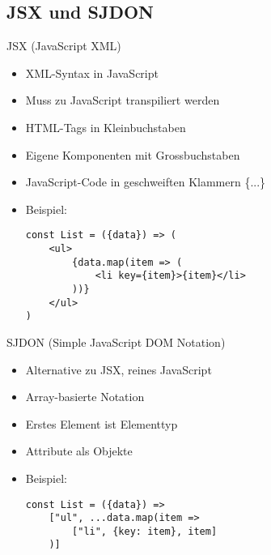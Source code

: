 \subsection{JSX und SJDON}
\begin{KR}{JSX (JavaScript XML)}
    \begin{itemize}
        \item XML-Syntax in JavaScript
        \item Muss zu JavaScript transpiliert werden
        \item HTML-Tags in Kleinbuchstaben
        \item Eigene Komponenten mit Grossbuchstaben
        \item JavaScript-Code in geschweiften Klammern \{...\}
        \item Beispiel:
            \begin{verbatim}
const List = ({data}) => (
    <ul>
        {data.map(item => (
            <li key={item}>{item}</li>
        ))}
    </ul>
)
            \end{verbatim}
    \end{itemize}
\end{KR}

\begin{KR}{SJDON (Simple JavaScript DOM Notation)}
    \begin{itemize}
        \item Alternative zu JSX, reines JavaScript
        \item Array-basierte Notation
        \item Erstes Element ist Elementtyp
        \item Attribute als Objekte
        \item Beispiel:
            \begin{verbatim}
const List = ({data}) =>
    ["ul", ...data.map(item => 
        ["li", {key: item}, item]
    )]
            \end{verbatim}
    \end{itemize}
\end{KR}

